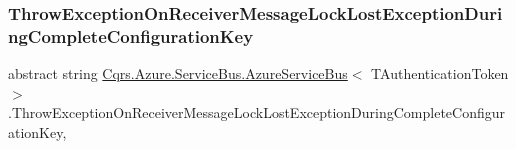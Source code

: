 \subsubsection{\texorpdfstring{Throw\+Exception\+On\+Receiver\+Message\+Lock\+Lost\+Exception\+During\+Complete\+Configuration\+Key}{ThrowExceptionOnReceiverMessageLockLostExceptionDuringCompleteConfigurationKey}}
{\footnotesize\ttfamily abstract string \hyperlink{classCqrs_1_1Azure_1_1ServiceBus_1_1AzureServiceBus}{Cqrs.\+Azure.\+Service\+Bus.\+Azure\+Service\+Bus}$<$ T\+Authentication\+Token $>$.Throw\+Exception\+On\+Receiver\+Message\+Lock\+Lost\+Exception\+During\+Complete\+Configuration\+Key\hspace{0.3cm}{\ttfamily [get]}, {\ttfamily [protected]}}

